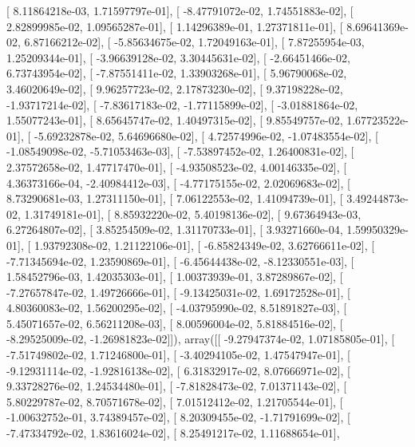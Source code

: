 \documentclass{article}
\begin{document}
       [  8.11864218e-03,   1.71597797e-01],
       [ -8.47791072e-02,   1.74551883e-02],
       [  2.82899985e-02,   1.09565287e-01],
       [  1.14296389e-01,   1.27371811e-01],
       [  8.69641369e-02,   6.87166212e-02],
       [ -5.85634675e-02,   1.72049163e-01],
       [  7.87255954e-03,   1.25209344e-01],
       [ -3.96639128e-02,   3.30445631e-02],
       [ -2.66451466e-02,   6.73743954e-02],
       [ -7.87551411e-02,   1.33903268e-01],
       [  5.96790068e-02,   3.46020649e-02],
       [  9.96257723e-02,   2.17873230e-02],
       [  9.37198228e-02,  -1.93717214e-02],
       [ -7.83617183e-02,  -1.77115899e-02],
       [ -3.01881864e-02,   1.55077243e-01],
       [  8.65645747e-02,   1.40497315e-02],
       [  9.85549757e-02,   1.67723522e-01],
       [ -5.69232878e-02,   5.64696680e-02],
       [  4.72574996e-02,  -1.07483554e-02],
       [ -1.08549098e-02,  -5.71053463e-03],
       [ -7.53897452e-02,   1.26400831e-02],
       [  2.37572658e-02,   1.47717470e-01],
       [ -4.93508523e-02,   4.00146335e-02],
       [  4.36373166e-04,  -2.40984412e-03],
       [ -4.77175155e-02,   2.02069683e-02],
       [  8.73290681e-03,   1.27311150e-01],
       [  7.06122553e-02,   1.41094739e-01],
       [  3.49244873e-02,   1.31749181e-01],
       [  8.85932220e-02,   5.40198136e-02],
       [  9.67364943e-03,   6.27264807e-02],
       [  3.85254509e-02,   1.31170733e-01],
       [  3.93271660e-04,   1.59950329e-01],
       [  1.93792308e-02,   1.21122106e-01],
       [ -6.85824349e-02,   3.62766611e-02],
       [ -7.71345694e-02,   1.23590869e-01],
       [ -6.45644438e-02,  -8.12330551e-03],
       [  1.58452796e-03,   1.42035303e-01],
       [  1.00373939e-01,   3.87289867e-02],
       [ -7.27657847e-02,   1.49726666e-01],
       [ -9.13425031e-02,   1.69172528e-01],
       [  4.80360083e-02,   1.56200295e-02],
       [ -4.03795990e-02,   8.51891827e-03],
       [  5.45071657e-02,   6.56211208e-03],
       [  8.00596004e-02,   5.81884516e-02],
       [ -8.29525009e-02,  -1.26981823e-02]]), array([[ -9.27947374e-02,   1.07185805e-01],
       [ -7.51749802e-02,   1.71246800e-01],
       [ -3.40294105e-02,   1.47547947e-01],
       [ -9.12931114e-02,  -1.92816138e-02],
       [  6.31832917e-02,   8.07666971e-02],
       [  9.33728276e-02,   1.24534480e-01],
       [ -7.81828473e-02,   7.01371143e-02],
       [  5.80229787e-02,   8.70571678e-02],
       [  7.01512412e-02,   1.21705544e-01],
       [ -1.00632752e-01,   3.74389457e-02],
       [  8.20309455e-02,  -1.71791699e-02],
       [ -7.47334792e-02,   1.83616024e-02],
       [  8.25491217e-02,   1.11688654e-01],
\end{document}
